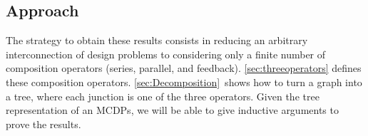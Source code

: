 \subsection{Approach}

The strategy to obtain these results consists in reducing an arbitrary
interconnection of design problems to considering only a finite
number of composition operators (series, parallel, and feedback).
\cref{sec:threeoperators} defines these composition operators. \cref{sec:Decomposition}~shows
how to turn a graph into a tree, where each junction is one of the
three operators. Given the tree representation of an MCDPs, we will
be able to give inductive arguments to prove the results.

